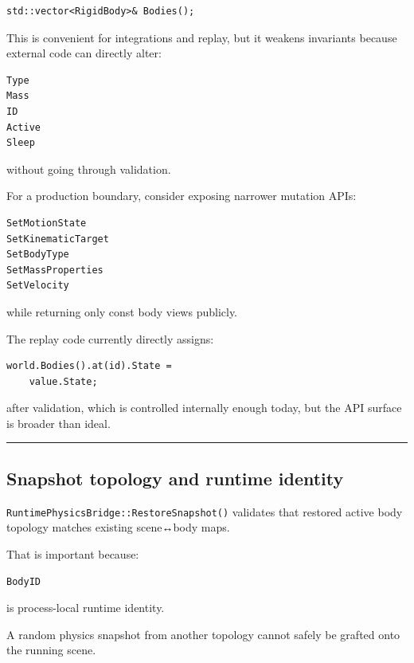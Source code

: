 \begin{verbatim}
std::vector<RigidBody>& Bodies();
\end{verbatim}

This is convenient for integrations and replay, but it weakens invariants because external code can directly alter:

\begin{verbatim}
Type
Mass
ID
Active
Sleep
\end{verbatim}

without going through validation.

For a production boundary, consider exposing narrower mutation APIs:

\begin{verbatim}
SetMotionState
SetKinematicTarget
SetBodyType
SetMassProperties
SetVelocity
\end{verbatim}

while returning only const body views publicly.

The replay code currently directly assigns:

\begin{verbatim}
world.Bodies().at(id).State =
    value.State;
\end{verbatim}

after validation, which is controlled internally enough today, but the API surface is broader than ideal.

\begin{center}\rule{0.5\linewidth}{0.5pt}\end{center}

\subsection{Snapshot topology and runtime identity}\label{06-engine-ii-ch038-snapshot-topology-and-runtime-identity}

\hypertarget{06-engine-ii-ch038-snapshot-topology-and-runtime-identity}{}

\texttt{RuntimePhysicsBridge::RestoreSnapshot()} validates that restored active body topology matches existing scene↔body maps.

That is important because:

\begin{verbatim}
BodyID
\end{verbatim}

is process-local runtime identity.

A random physics snapshot from another topology cannot safely be grafted onto the running scene.

